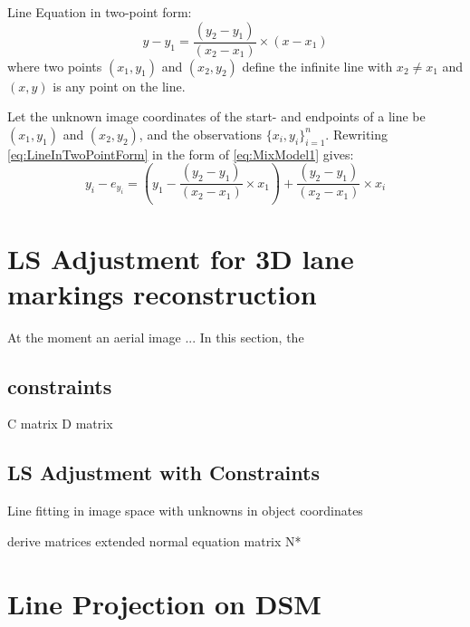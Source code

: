 Line Equation in two-point form:
\begin{equation} \label{eq:LineInTwoPointForm}
y-y_1 = \dfrac{(y_2-y_1)}{(x_2-x_1)}\times(x-x_1)
\end{equation}
where two points $(x_1,y_1)$ and $(x_2,y_2)$ define the infinite line with $x_2\neq x_1$ and $(x,y)$ is any point on the line.

Let the unknown image coordinates of the start- and endpoints of a line be $(x_1,y_1)$ and $(x_2,y_2)$, and the observations $\{x_i,y_i\}^n_{i=1}$. Rewriting \eqref{eq:LineInTwoPointForm} in the form of \eqref{eq:MixModel1} gives:
\begin{equation} %
y_i - e_{y_i}= (y_1-\dfrac{(y_2-y_1)}{(x_2-x_1)}\times x_1) + \dfrac{(y_2-y_1)}{(x_2-x_1)}\times x_i
\end{equation}


\section{LS Adjustment for 3D lane markings reconstruction}
\label{sec:LSadj}

At the moment an aerial image ...
In this section, the

\subsection{constraints}
\label{subsec:}

C matrix
D matrix

\subsection{LS Adjustment with Constraints}
\label{sec:}
Line fitting in image space with unknowns in object coordinates


derive matrices
extended normal equation matrix N*


\section{Line Projection on DSM}
\label{sec:LineProjectionOnDSM}

